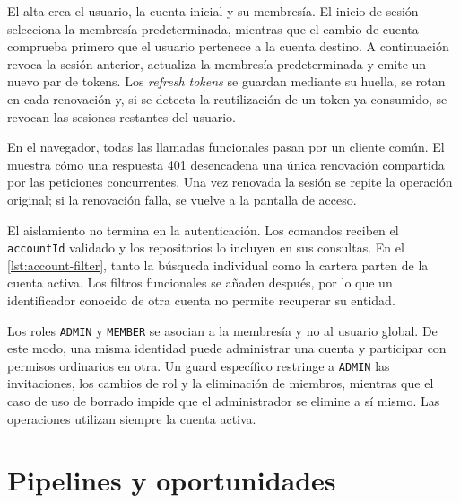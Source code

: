 El alta crea el usuario, la cuenta inicial y su membresía. El inicio de sesión
selecciona la membresía predeterminada, mientras que el cambio de cuenta
comprueba primero que el usuario pertenece a la cuenta destino. A continuación
revoca la sesión anterior, actualiza la membresía predeterminada y emite un
nuevo par de tokens. Los \emph{refresh tokens} se guardan mediante su huella,
se rotan en cada renovación y, si se detecta la reutilización de un token ya
consumido, se revocan las sesiones restantes del usuario.

En el navegador, todas las llamadas funcionales pasan por un cliente común. El
 muestra cómo una respuesta 401 desencadena una única
renovación compartida por las peticiones concurrentes. Una vez renovada la
sesión se repite la operación original; si la renovación falla, se vuelve a la
pantalla de acceso.



El aislamiento no termina en la autenticación. Los comandos reciben el
\texttt{accountId} validado y los repositorios lo incluyen en sus consultas.
En el \cref{lst:account-filter}, tanto la búsqueda individual como la cartera
parten de la cuenta activa. Los filtros funcionales se añaden después, por lo
que un identificador conocido de otra cuenta no permite recuperar su entidad.



Los roles \texttt{ADMIN} y \texttt{MEMBER} se asocian a la membresía y no al
usuario global. De este modo, una misma identidad puede administrar una cuenta
y participar con permisos ordinarios en otra. Un guard específico restringe a
\texttt{ADMIN} las invitaciones, los cambios de rol y la eliminación de
miembros, mientras que el caso de uso de borrado impide que el administrador se
elimine a sí mismo. Las operaciones utilizan siempre la cuenta activa.

\section{Pipelines y oportunidades}

